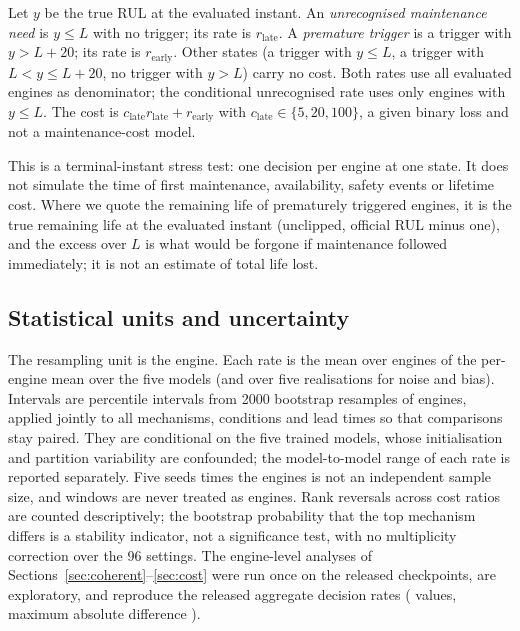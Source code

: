Let $y$ be the true RUL at the evaluated instant. An \emph{unrecognised maintenance need} is $y\le L$ with no trigger; its rate is $r_{\mathrm{late}}$. A \emph{premature trigger} is a trigger with $y>L+20$; its rate is $r_{\mathrm{early}}$. Other states (a trigger with $y\le L$, a trigger with $L<y\le L+20$, no trigger with $y>L$) carry no cost. Both rates use all evaluated engines as denominator; the conditional unrecognised rate uses only engines with $y\le L$. The cost is $c_{\mathrm{late}}r_{\mathrm{late}}+r_{\mathrm{early}}$ with $c_{\mathrm{late}}\in\{5,20,100\}$, a given binary loss and not a maintenance-cost model.

This is a terminal-instant stress test: one decision per engine at one state. It does not simulate the time of first maintenance, availability, safety events or lifetime cost. Where we quote the remaining life of prematurely triggered engines, it is the true remaining life at the evaluated instant (unclipped, official RUL minus one), and the excess over $L$ is what would be forgone if maintenance followed immediately; it is not an estimate of total life lost.

\subsection{Statistical units and uncertainty}
The resampling unit is the engine. Each rate is the mean over engines of the per-engine mean over the five models (and over five realisations for noise and bias). Intervals are percentile intervals from 2000 bootstrap resamples of engines, applied jointly to all mechanisms, conditions and lead times so that comparisons stay paired. They are conditional on the five trained models, whose initialisation and partition variability are confounded; the model-to-model range of each rate is reported separately. Five seeds times the engines is not an independent sample size, and windows are never treated as engines. Rank reversals across cost ratios are counted descriptively; the bootstrap probability that the top mechanism differs is a stability indicator, not a significance test, with no multiplicity correction over the 96 settings. The engine-level analyses of Sections~\ref{sec:coherent}--\ref{sec:cost} were run once on the released checkpoints, are exploratory, and reproduce the released aggregate decision rates (\JAgreeN{} values, maximum absolute difference \JAgreeMax).
